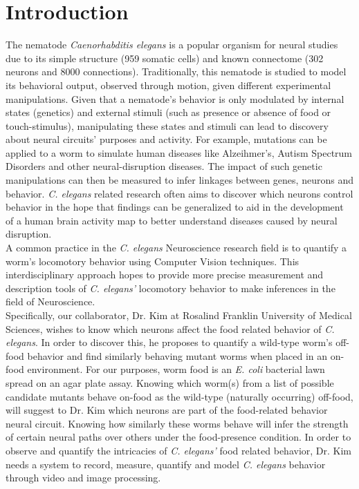 \documentclass[main.tex]{subfiles}
\begin{document}
\section{Introduction}
The nematode \textit{Caenorhabditis elegans} is a popular organism for neural studies due to its simple structure (959 somatic cells) and known connectome (302 neurons and 8000 connections). Traditionally, this nematode is studied to model its behavioral output, observed through motion, given different experimental manipulations. Given that a nematode's behavior is only modulated by internal states (genetics) and external stimuli (such as presence or absence of food or touch-stimulus), manipulating these states and stimuli can lead to discovery about neural circuits' purposes and activity. For example, mutations can be applied to a worm to simulate human diseases like Alzeihmer's, Autism Spectrum Disorders and other neural-disruption diseases. The impact of such genetic manipulations can then be measured to infer linkages between genes, neurons and behavior. \textit{C. elegans} related research often aims to discover which neurons control behavior in the hope that findings can be generalized to aid in the development of a human brain activity map to better understand diseases caused by neural disruption.\\

A common practice in the \textit{C. elegans} Neuroscience research field is to quantify a worm's locomotory behavior using Computer Vision techniques. This interdisciplinary approach hopes to provide more precise measurement and description tools of \textit{C. elegans'} locomotory behavior to make inferences in the field of Neuroscience.\\

Specifically, our collaborator, Dr. Kim at Rosalind Franklin University of Medical Sciences, wishes to know which neurons affect the food related behavior of \textit{C. elegans}. In order to discover this, he proposes to quantify a wild-type worm's off-food behavior and find similarly behaving mutant worms when placed in an on-food environment. For our purposes, worm food is an \textit{E. coli} bacterial lawn spread on an agar plate assay. Knowing which worm(s) from a list of possible candidate mutants behave on-food as the wild-type (naturally occurring) off-food, will suggest to Dr. Kim which neurons are part of the food-related behavior neural circuit. Knowing how similarly these worms behave will infer the strength of certain neural paths over others under the food-presence condition. In order to observe and quantify the intricacies of \textit{C. elegans'} food related behavior, Dr. Kim needs a system to record, measure, quantify and model \textit{C. elegans} behavior through video and image processing. \\
\end{document}
